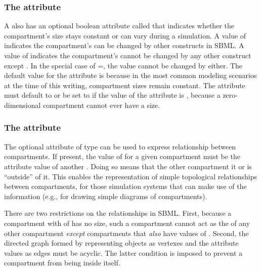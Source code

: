 \subsubsection{The  attribute}
\label{sec:compartment-constant}

A \Compartment also has an optional boolean attribute called
 that indicates whether the compartment's size
stays constant or can vary during a simulation.  A value of
 indicates the compartment's  can be
changed by other constructs in SBML.  A value of 
indicates the compartment's  cannot be changed by any
other construct except \InitialAssignment.  In the special case of
=, the value cannot be changed by
\InitialAssignment either.  The default value for the
 attribute is  because in the most common
modeling scenarios at the time of this writing, compartment sizes
remain constant.  The  attribute must default to or be
set to  if the value of the 
attribute is , because a zero-dimensional compartment cannot
ever have a size.


\subsubsection{The  attribute}
\label{sec:compartment-outside}

The optional attribute  of type  can be
used to express  relationship between compartments. If
present, the value of  for a given compartment must
be the  attribute value of another .  Doing so means that the other compartment
 it or is ``outside'' of it.  This enables the
representation of simple topological relationships between
compartments, for those simulation systems that can make use of
the information (e.g., for drawing simple diagrams of
compartments).

There are two restrictions on the  relationships in SBML.
First, because a compartment with
 of  has no size, such a
compartment cannot act as the  of any other compartment
\emph{except} compartments that \emph{also} have
 values of .  Second, the directed
graph formed by representing \Compartment objects as vertexes
and the  attribute values as edges must be acyclic.
The latter condition is imposed to prevent a compartment from
being  inside itself.

